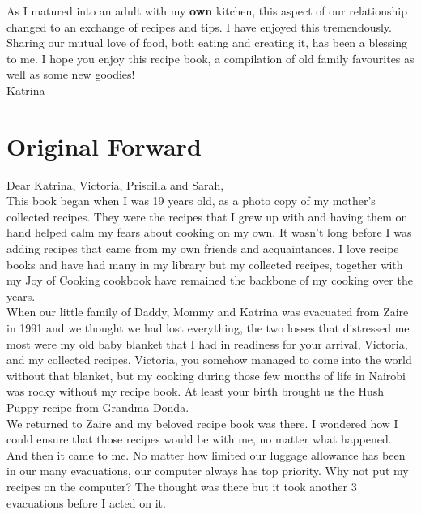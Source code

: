 \documentclass[12pt]{memoir} %
\begin{document}
As I matured into an adult with my \textbf{own} kitchen, this aspect of our relationship changed to an exchange of recipes and tips. I have enjoyed this tremendously. Sharing our mutual love of food, both eating and creating it, has been a blessing to me. I hope you enjoy this recipe book, a compilation of old family favourites as well as some new goodies! \\[10pt]

\hspace{0.5\linewidth}Katrina

\chapter*{Original Forward} %

Dear Katrina, Victoria, Priscilla and Sarah, \\[10pt]

This book began when I was 19 years old, as a photo copy of my mother's collected recipes. They were the recipes that I grew up with and having them on hand helped calm my fears about cooking on my own. It wasn't long before I was adding recipes that came from my own friends and acquaintances. I love recipe books and have had many in my library but my collected recipes, together with my Joy of Cooking cookbook have remained the backbone of my cooking over the years. \\[10pt]

When our little family of Daddy, Mommy and Katrina was evacuated from Zaire in 1991 and we thought we had lost everything, the two losses that distressed me most were my old baby blanket that I had in readiness for your arrival, Victoria, and my collected recipes. Victoria, you somehow managed to come into the world without that blanket, but my cooking during those few months of life in Nairobi was rocky without my recipe book. At least your birth brought us the Hush Puppy recipe from Grandma Donda. \\[10pt]

We returned to Zaire and my beloved recipe book was there. I wondered how I could ensure that those recipes would be with me, no matter what happened. And then it came to me. No matter how limited our luggage allowance has been in our many evacuations, our computer always has top priority. Why not put my recipes on the computer? The thought was there but it took another 3 evacuations before I acted on it. \\[10pt]
\end{document}
